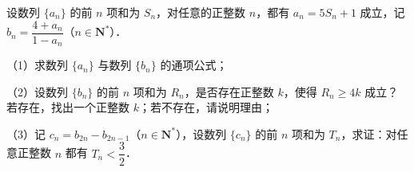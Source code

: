 \begin{question}
设数列 $\{a_n\}$ 的前 $n$ 项和为 $S_n$，对任意的正整数 $n$，都有 $a_n=5S_n+1$ 成立，记 $b_n=\dfrac{4+a_n}{1-a_n}$（$n\in\mathbf N^*$）．

（1）求数列 $\{a_n\}$ 与数列 $\{b_n\}$ 的通项公式；

（2）设数列 $\{b_n\}$ 的前 $n$ 项和为 $R_n$，是否存在正整数 $k$，使得 $R_n\geqslant4k$ 成立？若存在，找出一个正整数 $k$；若不存在，请说明理由；

（3）记 $c_n=b_{2n}-b_{2n-1}$（$n\in\mathbf N^*$），设数列 $\{c_n\}$ 的前 $n$ 项和为 $T_n$，求证：对任意正整数 $n$ 都有 $T_n<\dfrac32$．

\end{question}